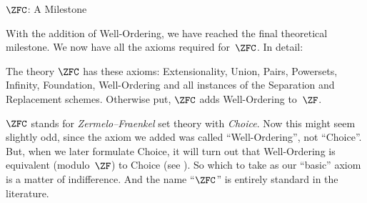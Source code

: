 \documentclass[../../../include/open-logic-section]{subfiles}
\begin{document}
	{$\ZFC$: A Milestone}

With the addition of Well-Ordering, we have reached the final
theoretical milestone. We now have all the axioms required for~$\ZFC$.
In detail:

\begin{defn}
The theory $\ZFC$ has these axioms: Extensionality, Union, Pairs,
Powersets, Infinity, Foundation, Well-Ordering and all instances of
the Separation and Replacement schemes. Otherwise put, $\ZFC$ adds
Well-Ordering to~$\ZF$. 
\end{defn}

$\ZFC$ stands for \emph{Zermelo--Fraenkel} set theory with
\emph{Choice}. Now this might seem slightly odd, since the axiom we
added was called ``Well-Ordering'', not ``Choice''. But, when we later
formulate {Choice}, it will turn out that Well-Ordering is equivalent
(modulo~$\ZF$) to Choice (see ).
So which to take as our ``basic'' axiom is a matter of indifference.
And the name ``$\ZFC$'' is entirely standard in the literature. 
\end{document}
